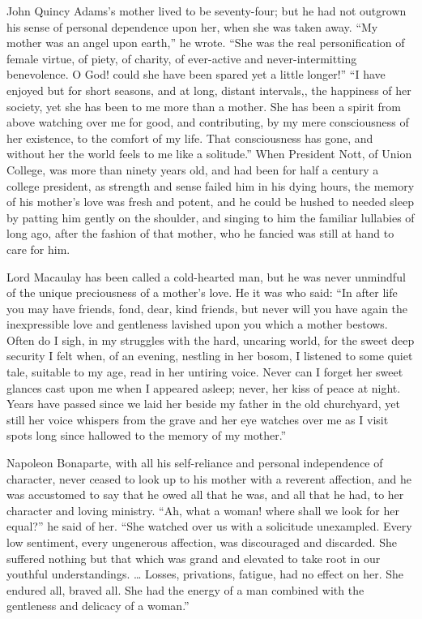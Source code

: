 \documentclass[
]{book}
\begin{document}
John Quincy Adams's mother lived to be seventy-four; but he had not outgrown his sense of personal dependence upon her, when she was taken away. ``My mother was an angel upon earth,'' he wrote. ``She was the real personification of female virtue, of piety, of charity, of ever-active and never-intermitting benevolence. O God! could she have been spared yet a little longer!'' ``I have enjoyed but for short seasons, and at long, distant intervals,, the happiness of her society, yet she has been to me more than a mother. She has been a spirit from above watching over me for good, and contributing, by my mere consciousness of her existence, to the comfort of my life. That consciousness has gone, and without her the world feels to me like a solitude.'' When President Nott, of Union College, was more than ninety years old, and had been for half a century a college president, as strength and sense failed him in his dying hours, the memory of his mother's love was fresh and potent, and he could be hushed to needed sleep by patting him gently on the shoulder, and singing to him the familiar lullabies of long ago, after the fashion of that mother, who he fancied was still at hand to care for him.

Lord Macaulay has been called a cold-hearted man, but he was never unmindful of the unique preciousness of a mother's love. He it was who said: ``In after life you may have friends, fond, dear, kind friends, but never will you have again the inexpressible love and gentleness lavished upon you which a mother bestows. Often do I sigh, in my struggles with the hard, uncaring world, for the sweet deep security I felt when, of an evening, nestling in her bosom, I listened to some quiet tale, suitable to my age, read in her untiring voice. Never can I forget her sweet glances cast upon me when I appeared asleep; never, her kiss of peace at night. Years have passed since we laid her beside my father in the old churchyard, yet still her voice whispers from the grave and her eye watches over me as I visit spots long since hallowed to the memory of my mother.''

Napoleon Bonaparte, with all his self-reliance and personal independence of character, never ceased to look up to his mother with a reverent affection, and he was accustomed to say that he owed all that he was, and all that he had, to her character and loving ministry. ``Ah, what a woman! where shall we look for her equal?'' he said of her. ``She watched over us with a solicitude unexampled. Every low sentiment, every ungenerous affection, was discouraged and discarded. She suffered nothing but that which was grand and elevated to take root in our youthful understandings. \ldots{} Losses, privations, fatigue, had no effect on her. She endured all, braved all. She had the energy of a man combined with the gentleness and delicacy of a woman.''
\end{document}
